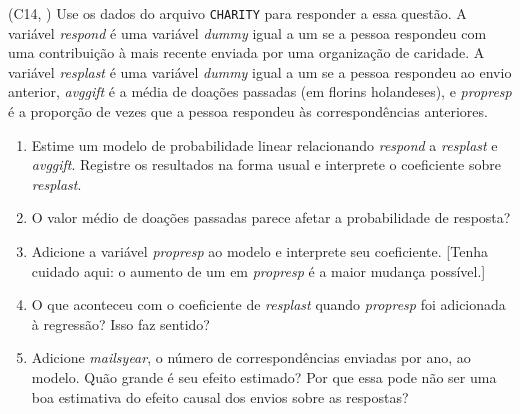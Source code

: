 \documentclass[12pt,letterpaper, onecolumn]{exam}
\begin{document}
\begin{questions}
\question\qstar (C14, \citep{wooldridge2016}) Use os dados do arquivo \texttt{CHARITY} para responder a essa questão. A variável \textit{respond} é uma variável \textit{dummy} igual a um se a pessoa respondeu com uma contribuição à mais recente enviada por uma organização de caridade. A variável \textit{resplast} é uma variável \textit{dummy} igual a um se a pessoa respondeu ao envio anterior, \textit{avggift} é a média de doações passadas (em florins holandeses), e \textit{propresp} é a proporção de vezes que a pessoa respondeu às correspondências anteriores.
\begin{enumerate}[label=(\roman*)]
    \item Estime um modelo de probabilidade linear relacionando \textit{respond} a \textit{resplast} e \textit{avggift}. Registre os resultados na forma usual e interprete o coeficiente sobre \textit{resplast}.
    \item O valor médio de doações passadas parece afetar a probabilidade de resposta?
    \item Adicione a variável \textit{propresp} ao modelo e interprete seu coeficiente. [Tenha cuidado aqui: o aumento de um em \textit{propresp} é a maior mudança possível.]
    \item O que aconteceu com o coeficiente de \textit{resplast} quando \textit{propresp} foi adicionada à regressão? Isso faz sentido?
    \item Adicione \textit{mailsyear}, o número de correspondências enviadas por ano, ao modelo. Quão grande é seu efeito estimado? Por que essa pode não ser uma boa estimativa do efeito causal dos envios sobre as respostas?
\end{enumerate}

\end{questions}
\newpage


\end{document}
